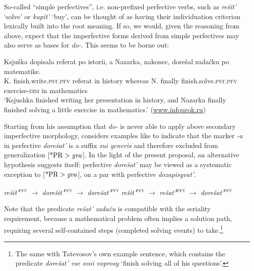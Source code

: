 \documentclass[output=paper,
colorlinks,
citecolor=brown,
newtxmath
]{langscibook}
\begin{document}
So-called ``simple perfectives'', i.e. non-prefixed perfective verbs, such as \textit{rešit'} `solve' or \textit{kupit'} `buy', can be thought of as having their individuation criterion lexically built into the root meaning. If so, we would, given the reasoning from above, expect that the imperfective forms derived from simple perfectives may also serve as bases for \textit{do-}. This seems to be borne out:


\ea\label{mathe}
\gll Ksjuška dopisala referat po istorii, a Nazarka, nakonec, dorešal zadačku po matematike.\\
K.  {finish.write.}\textsc{pst.pfv} referat in history whereas N. finally {finish.solve.}\textsc{pst.pfv} exercise-\textsc{dim} in mathematics\\
\glt `Ksjushka finished writing her presentation in history, and Nazarka finally finished solving a little exercise in mathematics.' \hfill (\url{www.infourok.ru})
\z

\noindent Starting from his assumption that \textit{do-} is never able to apply above secondary imperfective morphology,  \citet[135]{Tatevosov2009} considers examples like  to indicate that the marker \textit{-a} in perfective \textit{dorešat'} is a suffix \textit{sui generis} and therefore excluded from generalization [$\text{*PR}>\text{\textit{yva}}$].
In the light of the present proposal, an alternative hypothesis suggests itself: perfective \textit{dorešat'} may be viewed as a systematic exception to [$\text{*PR}>\text{\textit{yva}}$], on a par with perfective \textit{dozapisyvat'}.


\ea\label{dhx1}
\ea \textit{rešit'}\textsuperscript{\textsc{pfv}} $\rightarrow$ \textit{dorešit'}\textsuperscript{\textsc{pfv}} $\rightarrow$ \textit{dorešat'}\textsuperscript{\textsc{pfv}}
\ex \textit{rešit'}\textsuperscript{\textsc{pfv}} $\rightarrow$ \textit{rešat'}\textsuperscript{\textsc{ipfv}} $\rightarrow$ \textit{dorešat'}\textsuperscript{\textsc{pfv}}
\z\z

\noindent Note that the predicate \textit{rešat' zadaču} is compatible with the seriality requirement, because a mathematical problem often implies a solution path, requiring several self-contained steps (completed solving events) to take.\footnote{The same with Tatevosov's own example sentence, which contains the predicate \textit{dorešat' vse svoi voprosy} `finish solving all of his questions'.}
\end{document}
